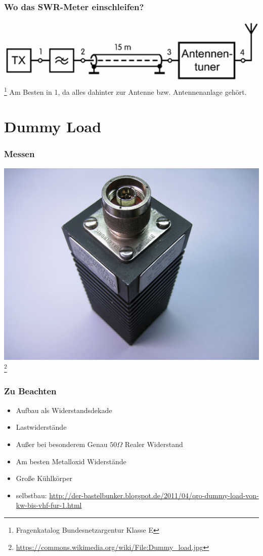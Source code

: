 \begin{frame}
    \frametitle{Wo das SWR-Meter einschleifen?}
        \includegraphics[width=.97\textwidth]{e17/SWROrt.png}
        \footnote{\tiny Fragenkatalog Bundesnetzargentur Klasse E}
    Am Besten in 1, da alles dahinter zur Antenne bzw. Antennenanlage gehört.
\end{frame}


\section*{Dummy Load}

\begin{frame}
    \frametitle{Messen}
    \begin{center}
        \includegraphics[width=.99\textwidth]{e17/DummyLoad.jpg}
        \footnote{\tiny \url{https://commons.wikimedia.org/wiki/File:Dummy_load.jpg}}
	\end{center}
\end{frame}

\begin{frame}
    \frametitle{Zu Beachten}
    \begin{itemize}
		\item Aufbau als Widerstandsdekade
		\item Lastwiderstände
		\item Außer bei besonderem Genau $50 \Omega$ Realer Widerstand
		\item Am besten Metalloxid Widerstände
		\item Große Kühlkörper
		\item selbstbau: \url{http://der-bastelbunker.blogspot.de/2011/04/qro-dummy-load-von-kw-bis-vhf-fur-1.html}
    \end{itemize}
\end{frame}

